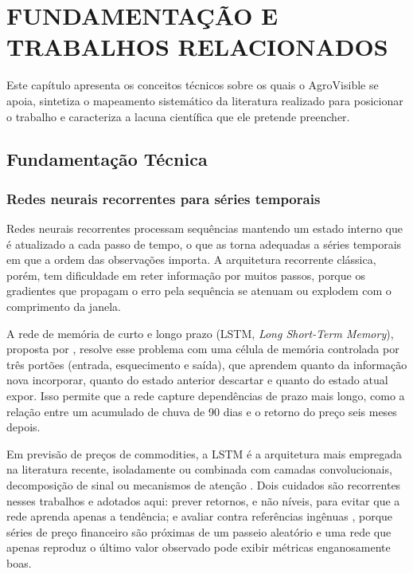 \chapter{\MakeUppercase{Fundamentação e Trabalhos Relacionados}}\label{sec:fundamentacao}

Este capítulo apresenta os conceitos técnicos sobre os quais o AgroVisible se apoia, sintetiza o mapeamento sistemático da literatura realizado para posicionar o trabalho e caracteriza a lacuna científica que ele pretende preencher.

\section{Fundamentação Técnica}\label{sec2:fund-tecnica}

\subsection{Redes neurais recorrentes para séries temporais}

Redes neurais recorrentes processam sequências mantendo um estado interno que é atualizado a cada passo de tempo, o que as torna adequadas a séries temporais em que a ordem das observações importa. A arquitetura recorrente clássica, porém, tem dificuldade em reter informação por muitos passos, porque os gradientes que propagam o erro pela sequência se atenuam ou explodem com o comprimento da janela.

A rede de memória de curto e longo prazo (LSTM, \textit{Long Short-Term Memory}), proposta por , resolve esse problema com uma célula de memória controlada por três portões (entrada, esquecimento e saída), que aprendem quanto da informação nova incorporar, quanto do estado anterior descartar e quanto do estado atual expor. Isso permite que a rede capture dependências de prazo mais longo, como a relação entre um acumulado de chuva de 90 dias e o retorno do preço seis meses depois.

Em previsão de preços de commodities, a LSTM é a arquitetura mais empregada na literatura recente, isoladamente ou combinada com camadas convolucionais, decomposição de sinal ou mecanismos de atenção \cite{K2023, Destriana2025, Huang2025}. Dois cuidados são recorrentes nesses trabalhos e adotados aqui: prever retornos, e não níveis, para evitar que a rede aprenda apenas a tendência; e avaliar contra referências ingênuas \cite{Srichaiyan2025}, porque séries de preço financeiro são próximas de um passeio aleatório e uma rede que apenas reproduz o último valor observado pode exibir métricas enganosamente boas.

